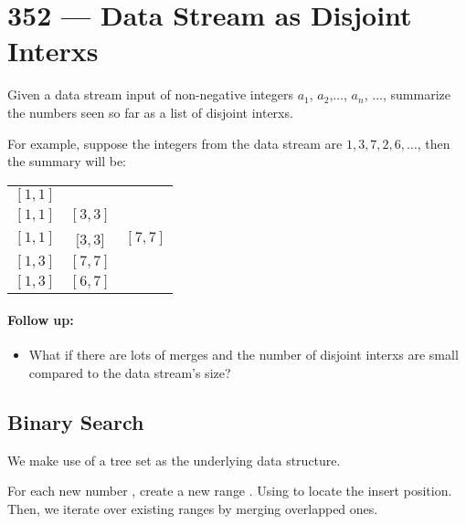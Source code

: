 \section{352 --- Data Stream as Disjoint Interxs}
Given a data stream input of non-negative integers $ a_1 $, $ a_2 $,$ \ldots$, $ a_n $, $ \ldots $, summarize the numbers seen so far as a list of disjoint interxs.
\par
For example, suppose the integers from the data stream are $ 1, 3, 7, 2, 6, \ldots $, then the summary will be:
\begin{table}[H]
\begin{tabular}{ccc}
$ [1, 1] $ & & \\
$ [1, 1] $ & $ [3, 3] $ & \\
$ [1, 1] $ & $ [3, 3 $] & $ [7, 7] $\\
$ [1, 3] $ & $ [7, 7] $  & \\
$ [1, 3] $ & $ [6, 7] $
\end{tabular}
\end{table}


\paragraph{Follow up:}
\begin{itemize}
\item What if there are lots of merges and the number of disjoint interxs are small compared to the data stream's size?
\end{itemize}

\subsection{Binary Search}
We make use of a tree set as the underlying data structure. 

For each new number , create a new range . Using  to locate the insert position. Then, we iterate over existing ranges by merging overlapped ones.

